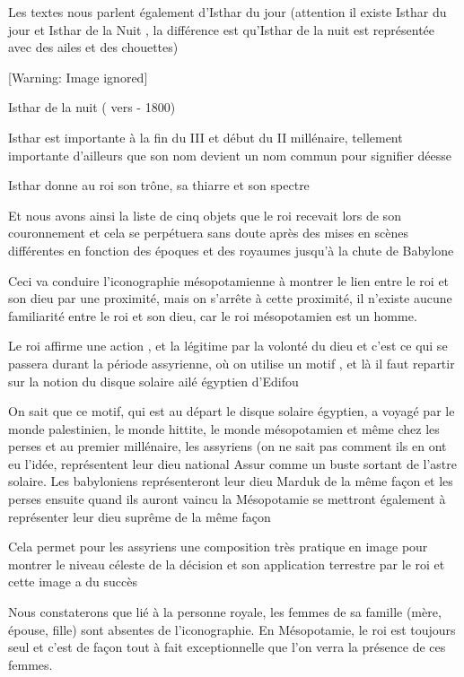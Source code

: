 \documentclass[a4paper,10pt]{article}
\begin{document}
Les textes nous parlent également d'Isthar  du jour
(attention il existe Isthar du jour et Isthar de la Nuit , la
différence est qu'Isthar de la nuit est représentée
avec des ailes et des chouettes)

  [Warning: Image ignored] %
 

Isthar de la nuit ( vers - 1800)\ \ 

Isthar est importante à la fin du III et début du II millénaire,
tellement importante d'ailleurs que son nom devient un
nom commun pour signifier déesse

Isthar donne au roi son trône, sa thiarre et son spectre 

Et nous avons ainsi la liste de cinq objets que le roi recevait lors de
son couronnement et cela se  perpétuera sans doute après des mises en
scènes différentes en fonction des époques et des royaumes
jusqu'à la chute de Babylone

Ceci va conduire l'iconographie mésopotamienne à
montrer le lien entre le roi et son dieu par une proximité, mais on
s'arrête à cette proximité, il
n'existe aucune familiarité entre le roi et son dieu,
car le roi mésopotamien est un homme.

Le roi affirme une action , et la légitime par la volonté du dieu et
c'est ce qui se passera durant la période assyrienne,
où on utilise un motif , et là il faut repartir sur la notion du disque
solaire ailé égyptien d'Edifou

On sait que ce motif, qui est au départ le disque solaire égyptien, a
voyagé par le monde palestinien, le monde hittite, le monde
mésopotamien et même chez les perses et au premier millénaire, les
assyriens (on ne sait pas comment ils en ont eu
l'idée, représentent leur dieu national Assur comme un
buste sortant de l'astre solaire. Les babyloniens
représenteront leur dieu Marduk de la même façon et les perses ensuite
quand ils auront vaincu la Mésopotamie se mettront également à
représenter leur dieu suprême de la même façon

\newline
Cela permet pour les assyriens une composition très pratique en image
pour montrer le niveau céleste de la décision et son application 
terrestre par le roi et cette image a du succès

Nous constaterons que lié à la personne royale, les femmes de sa famille
(mère, épouse, fille) sont absentes de l'iconographie.
En Mésopotamie, le roi est toujours seul et c'est de
façon tout à fait exceptionnelle que l'on verra la 
présence de ces femmes.
\end{document}
